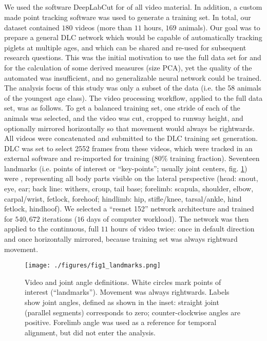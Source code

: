 \subsection{}
\label{sec:org3ecf574}
We used the software DeepLabCut \citep[DLC,][]{Mathis2018} for  of all video material.
In addition, a custom made point tracking software \citep{MMielke2020} was used to generate a training set.
In total, our dataset contained \(180\) videos (more than \(11\) hours, \(169\) animals).
Our goal was to prepare a general DLC network which would be capable of automatically tracking piglets at multiple ages, and which can be shared and re-used for subsequent research questions.
This was the initial motivation to use the full data set for  and for the calculation of some derived measures (size PCA), yet the quality of the automated  was insufficient, and no generalizable neural network could be trained.
The analysis focus of this study was only a subset of the data (i.e. the 58 animals of the youngest age class).
The video processing workflow, applied to the full data set, was as follows.
To get a balanced training set, one stride of each of the animals was selected, and the video was cut, cropped to runway height, and optionally mirrored horizontally so that movement would always be rightwards.
All videos were concatenated and submitted to the DLC training set generation.
DLC was set to select 2552 frames from these videos, which were tracked in an external software and re-imported for training (\(80 \%\) training fraction).
Seventeen landmarks (i.e. points of interest or ``key-points''; usually joint centers, fig. \ref{fig:landmarks}) were , representing all body parts visible on the lateral perspective (head: snout, eye, ear; back line: withers, croup, tail base; forelimb: scapula, shoulder, elbow, carpal/wrist, fetlock, forehoof; hindlimb: hip, stifle/knee, tarsal/ankle, hind fetlock, hindhoof).
We selected a ``resnet 152'' network architecture and trained for \(540,672\) iterations (\(16\) days of computer workload).
The network was then applied to  the continuous, full \(11\) hours of video twice: once in default direction and once horizontally mirrored, because training set was always rightward movement.

\begin{figure}[p]
\centering
\texttt{[image: ./figures/fig1\_landmarks.png]}
\caption{\label{fig:landmarks}Video  and joint angle definitions. White circles mark points of interest (``landmarks''). Movement was always rightwards. Labels show joint angles, defined as shown in the inset: straight joint (parallel segments) corresponds to zero; counter-clockwise  angles are positive. Forelimb  angle was used as a reference for temporal alignment, but did not enter the analysis.}
\end{figure}



